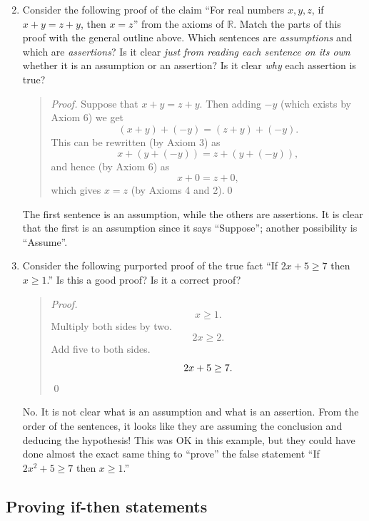\documentclass[12pt]{amsart}
\newcommand{\R}{{\mathbb{R}}}
\numberwithin{equation}{section}
\theoremstyle{plain} %
\theoremstyle{definition}
\theoremstyle{remark}
\begin{document}
\begin{enumerate}\setcounter{enumi}{1}
\item Consider the following proof of the claim ``For real numbers $x,y,z$, if $x+y=z+y$, then $x=z$'' from the axioms of $\R$. Match the parts of this proof with the general outline above. Which sentences are \emph{assumptions} and which are \emph{assertions}? Is it clear \emph{just from reading each sentence on its own} whether it is an assumption or an assertion? Is it clear \emph{why} each assertion is true?
\begin{quote}
\emph{Proof.} Suppose that $x+y=z+y$. Then adding $-y$ (which exists by Axiom 6) we get 
\[(x+y)+ (-y) = (z+y) + (-y).\]
This can be rewritten (by Axiom 3) as
\[x+ (y+ (-y) )= z+ (y + (-y)),\]
and hence (by Axiom 6) as
\[ x+ 0 = z+0,\]
which gives $x=z$ (by Axioms 4 and 2).\qed
\end{quote}
\begin{framed}
The first sentence is an assumption, while the others are assertions. It is clear that the first is an assumption since it says ``Suppose''; another possibility is ``Assume''.
\end{framed}



\item Consider the following purported proof of the true fact ``If $2x + 5 \geq 7$ then $x\geq 1$.'' Is this a good proof? Is it a correct proof?
\begin{quote}
\emph{Proof.}
\[ x \geq 1.\]
Multiply both sides by two.
\[ 2x \geq 2.\]
Add five to both sides.
\[2x+5 \geq 7. \qedhere\] \qed
\end{quote}

\begin{framed}
No. It is not clear what is an assumption and what is an assertion. From the order of the sentences, it looks like they are assuming the conclusion and deducing the hypothesis! This was OK in this example, but they could have done almost the exact same thing to ``prove'' the false statement ``If $2x^2 + 5 \geq 7$ then $x\geq 1$.''
\end{framed}
\end{enumerate}


\subsection*{Proving if-then statements}
\end{document}
